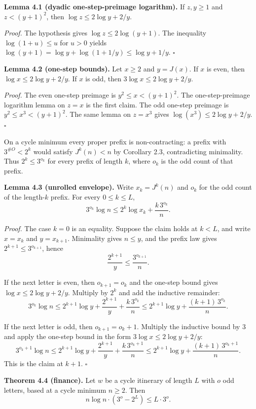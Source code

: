 \documentclass[12pt]{article}
\begin{document}
\textbf{Lemma 4.1 (dyadic one-step-preimage logarithm).} If \(z,y\ge 1\)
and \(z<(y+1)^2\), then \(\log z\le 2\log y+2/y\).

\emph{Proof.} The hypothesis gives \(\log z\le 2\log(y+1)\). The
inequality \(\log(1+u)\le u\) for \(u>0\) yields
\(\log(y+1)=\log y+\log(1+1/y)\le\log y+1/y\). \(\square\)

\textbf{Lemma 4.2 (one-step bounds).} Let \(x\ge 2\) and \(y=J(x)\). If
\(x\) is even, then \(\log x\le 2\log y+2/y\). If \(x\) is odd, then
\(3\log x\le 2\log y+2/y\).

\emph{Proof.} The even one-step preimage is \(y^2\le x<(y+1)^2\). The
one-step-preimage logarithm lemma on \(z=x\) is the first claim. The odd
one-step preimage is \(y^2\le x^3<(y+1)^2\). The same lemma on \(z=x^3\)
gives \(\log(x^3)\le 2\log y+2/y\). \(\square\)

On a cycle minimum every proper prefix is non-contracting: a prefix with
\(3^{\#O}<2^{k}\) would satisfy \(J^k(n)<n\) by Corollary 2.3,
contradicting minimality. Thus \(2^k\le 3^{o_k}\) for every prefix of
length \(k\), where \(o_k\) is the odd count of that prefix.

\textbf{Lemma 4.3 (unrolled envelope).} Write \(x_k=J^k(n)\) and \(o_k\)
for the odd count of the length-\(k\) prefix. For every \(0\le k\le L\),
\[
3^{o_k}\log n
\le
2^k\log x_k
+\frac{k\,3^{o_k}}{n}.
\]

\emph{Proof.} The case \(k=0\) is an equality. Suppose the claim holds
at \(k<L\), and write \(x=x_k\) and \(y=x_{k+1}\). Minimality gives
\(n\le y\), and the prefix law gives \(2^{k+1}\le 3^{o_{k+1}}\), hence
\[
\frac{2^{k+1}}{y}\le\frac{3^{o_{k+1}}}{n}.
\]

If the next letter is even, then \(o_{k+1}=o_k\) and the one-step bound
gives \(\log x\le 2\log y+2/y\). Multiply by \(2^k\) and add the
inductive remainder: \[
3^{o_k}\log n
\le
2^{k+1}\log y
+\frac{2^{k+1}}{y}
+\frac{k\,3^{o_k}}{n}
\le
2^{k+1}\log y
+\frac{(k+1)\,3^{o_k}}{n}.
\]

If the next letter is odd, then \(o_{k+1}=o_k+1\). Multiply the
inductive bound by \(3\) and apply the one-step bound in the form
\(3\log x\le 2\log y+2/y\): \[
3^{o_k+1}\log n
\le
2^{k+1}\log y
+\frac{2^{k+1}}{y}
+\frac{k\,3^{o_k+1}}{n}
\le
2^{k+1}\log y
+\frac{(k+1)\,3^{o_k+1}}{n}.
\] This is the claim at \(k+1\). \(\square\)

\vspace{0.8em}

\textbf{Theorem 4.4 (finance).} Let \(w\) be a cycle itinerary of length
\(L\) with \(o\) odd letters, based at a cycle minimum \(n\ge 2\). Then
\[
n\log n\cdot(3^o-2^L)\le L\cdot 3^o.
\]
\end{document}
